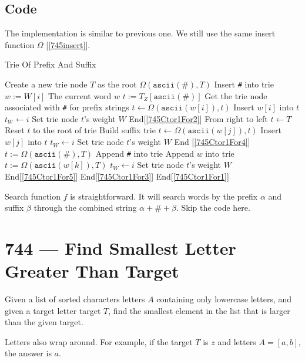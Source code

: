\subsection{Code}
The implementation is similar to previous one. We still use the same insert function $\Omega$ [\ref{745insert}].
\begin{algorithm}[H]
\caption{Trie Of Prefix And Suffix}
\begin{algorithmic}[1]
\State Create a new trie node $T$ as the root
\State $\Omega(\texttt{ascii}(\texttt{\#}), T)$ \Comment Insert \texttt{\#} into trie
 \label{745Ctor1For1}
\State $w:=W[i]$ \Comment The current word $w$
\State $t:=T_Z[\texttt{ascii}(\texttt{\#})]$ \Comment Get the trie node associated with \texttt{\#} for prefix strings
 \label{745Ctor1For2}
\State $t\gets \Omega(\texttt{ascii}(w[i]), t)$ \Comment Insert $w[i]$ into $t$
\State $t_W \gets i$ \Comment Set trie node $t$'s weight $W$
\EndFor \Comment End[\ref{745Ctor1For2}]
 \Comment From right to left \label{745Ctor1For3}
\State $t\gets T$ \Comment Reset $t$ to the root of trie
 \Comment Build suffix trie \label{745Ctor1For4}
\State $t\gets \Omega(\texttt{ascii}(w[j]), t)$ \Comment Insert $w[j]$ into $t$
\State $t_W \gets i$ \Comment Set trie node $t$'s weight $W$
\EndFor \Comment End [\ref{745Ctor1For4}]
\State $t:=\Omega(\texttt{ascii}(\texttt{\#}), T)$ \Comment Append \texttt{\#} into trie
 \Comment Append $w$ into trie \label{745Ctor1For5}
\State $t:=\Omega(\texttt{ascii}(w[k]), T)$ 
\State $t_W \gets i$ \Comment Set trie node $t$'s weight $W$
\EndFor \Comment End[\ref{745Ctor1For5}]
\EndFor \Comment End[\ref{745Ctor1For3}]
\EndFor \Comment End[\ref{745Ctor1For1}]
\EndProcedure
\end{algorithmic}
\end{algorithm}
Search function $f$ is straightforward. It will search words by the prefix $\alpha$ and suffix $\beta$ through the combined string $\alpha + \texttt{\#} + \beta$. Skip the code here. 

\section{744 --- Find Smallest Letter Greater Than Target}
Given a list of sorted characters letters $A$ containing only lowercase letters, and given a target letter target $T$, find the smallest element in the list that is larger than the given target.
\par
Letters also wrap around. For example, if the target $T$ is $z$ and letters $A = [a, b]$, the answer is $a$.
